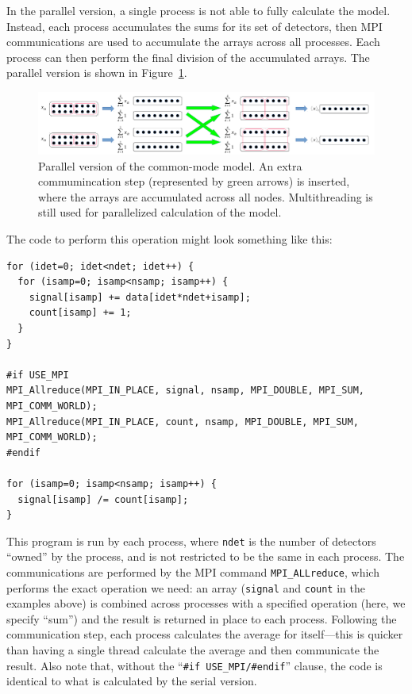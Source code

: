 \documentclass[oneside,11pt]{starlink}
\begin{document}
In the parallel version, a single process is not able to fully
calculate the model. Instead, each process accumulates the sums for
its set of detectors, then MPI communications are used to accumulate
the arrays across all processes. Each process can then perform the
final division of the accumulated arrays. The parallel version is
shown in Figure~\ref{fig:parallel_common}.

\begin{figure}[ht]
\begin{center}
\includegraphics[width=\textwidth]{ssn79_parallel_common}
\caption[Parallel Common-mode Model]{Parallel version of the
  common-mode model. An extra commumincation step (represented by
  green arrows) is inserted, where the arrays are accumulated across
  all nodes. Multithreading is still used for parallelized calculation
  of the model.}
\label{fig:parallel_common}
\end{center}
\end{figure}

The code to perform this operation might look something like this:

\begin{verbatim}
for (idet=0; idet<ndet; idet++) {
  for (isamp=0; isamp<nsamp; isamp++) {
    signal[isamp] += data[idet*ndet+isamp];
    count[isamp] += 1;
  }
}

#if USE_MPI
MPI_Allreduce(MPI_IN_PLACE, signal, nsamp, MPI_DOUBLE, MPI_SUM, MPI_COMM_WORLD);
MPI_Allreduce(MPI_IN_PLACE, count, nsamp, MPI_DOUBLE, MPI_SUM, MPI_COMM_WORLD);
#endif

for (isamp=0; isamp<nsamp; isamp++) {
  signal[isamp] /= count[isamp];
}
\end{verbatim}

This program is run by each process, where \verb+ndet+ is the number
of detectors ``owned'' by the process, and is not restricted to be the
same in each process. The communications are performed by the MPI
command \verb+MPI_ALLreduce+, which performs the exact operation we
need: an array (\verb+signal+ and \verb+count+ in the examples above)
is combined across processes with a specified operation (here, we
specify ``sum'') and the result is returned in place to each
process. Following the communication step, each process calculates the
average for itself---this is quicker than having a single thread
calculate the average and then communicate the result. Also note that,
without the ``\verb+#if USE_MPI/#endif+'' clause, the code is
identical to what is calculated by the serial version.
\end{document}
